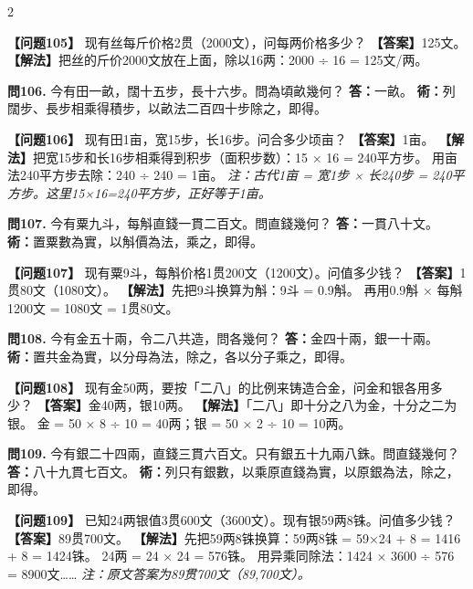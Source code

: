 \documentclass[11pt,a4paper]{article}
\begin{document}
\begin{paracol}{2}
\switchcolumn

\textbf{【问题105】} 现有丝每斤价格2贯（2000文），问每两价格多少？\break
\textbf{【答案】}125文。\break
\textbf{【解法】}把丝的斤价2000文放在上面，除以16两：2000 ÷ 16 = 125文/两。

\switchcolumn*

\textbf{問106.} 今有田一畝，闊十五步，長十六步。問為頃畝幾何？\break
\textbf{答：}一畝。\break
\textbf{術：}列闊步、長步相乘得積步，以畝法二百四十步除之，即得。

\switchcolumn

\textbf{【问题106】} 现有田1亩，宽15步，长16步。问合多少顷亩？\break
\textbf{【答案】}1亩。\break
\textbf{【解法】}把宽15步和长16步相乘得到积步（面积步数）：15 × 16 = 240平方步。\break
用亩法240平方步去除：240 ÷ 240 = 1亩。\break
\textit{注：古代1亩 = 宽1步 × 长240步 = 240平方步。这里15×16=240平方步，正好等于1亩。}

\switchcolumn*

\textbf{問107.} 今有粟九斗，每斛直錢一貫二百文。問直錢幾何？\break
\textbf{答：}一貫八十文。\break
\textbf{術：}置粟數為實，以斛價為法，乘之，即得。

\switchcolumn

\textbf{【问题107】} 现有粟9斗，每斛价格1贯200文（1200文）。问值多少钱？\break
\textbf{【答案】}1贯80文（1080文）。\break
\textbf{【解法】}先把9斗换算为斛：9斗 = 0.9斛。\break
再用0.9斛 × 每斛1200文 = 1080文 = 1贯80文。

\switchcolumn*

\textbf{問108.} 今有金五十兩，令二八共造，問各幾何？\break
\textbf{答：}金四十兩，銀一十兩。\break
\textbf{術：}置共金為實，以分母為法，除之，各以分子乘之，即得。

\switchcolumn

\textbf{【问题108】} 现有金50两，要按「二八」的比例来铸造合金，问金和银各用多少？\break
\textbf{【答案】}金40两，银10两。\break
\textbf{【解法】}「二八」即十分之八为金，十分之二为银。\break
金 = 50 × 8 ÷ 10 = 40两；银 = 50 × 2 ÷ 10 = 10两。

\switchcolumn*

\textbf{問109.} 今有銀二十四兩，直錢三貫六百文。只有銀五十九兩八銖。問直錢幾何？\break
\textbf{答：}八十九貫七百文。\break
\textbf{術：}列只有銀數，以乘原直錢為實，以原銀為法，除之，即得。

\switchcolumn

\textbf{【问题109】} 已知24两银值3贯600文（3600文）。现有银59两8铢。问值多少钱？\break
\textbf{【答案】}89贯700文。\break
\textbf{【解法】}先把59两8铢换算：59两8铢 = 59×24 + 8 = 1416 + 8 = 1424铢。\break
24两 = 24 × 24 = 576铢。\break
用异乘同除法：1424 × 3600 ÷ 576 = 8900文……\break
\textit{注：原文答案为89贯700文（89,700文）。}


\end{paracol}
\end{document}
